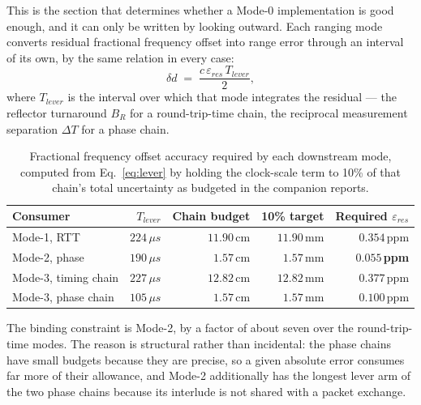 \documentclass[11pt,a4paper]{article}
\newcommand{\us}{\,\ensuremath{\upmu}s}
\providecommand{\upmu}{\mu}
\begin{document}
This is the section that determines whether a Mode-0 implementation is good enough, and it can only
be written by looking outward. Each ranging mode converts residual fractional frequency offset into
range error through an interval of its own, by the same relation in every case:
\begin{equation}
\delta d \;=\; \frac{c\,\varepsilon_{res}\,T_{lever}}{2},
\label{eq:lever}
\end{equation}
where $T_{lever}$ is the interval over which that mode integrates the residual --- the reflector
turnaround $B_R$ for a round-trip-time chain, the reciprocal measurement separation $\Delta T$ for a
phase chain.

\begin{table}[h]
\caption{Fractional frequency offset accuracy required by each downstream mode, computed from
Eq.~\eqref{eq:lever} by holding the clock-scale term to 10\% of that chain's total uncertainty as
budgeted in the companion reports.}
\label{tab:downstream}
\centering\small
\begin{tabular}{@{}L{40mm}rrrr@{}}
\toprule
Consumer & $T_{lever}$ & Chain budget & 10\% target & Required $\varepsilon_{res}$ \\
\midrule
Mode-1, RTT               & $224\us$ & $11.90$\,cm & $11.90$\,mm & $0.354$\,ppm \\
Mode-2, phase             & $190\us$ & $1.57$\,cm  & $1.57$\,mm  & $\mathbf{0.055}$\,\textbf{ppm} \\
Mode-3, timing chain      & $227\us$ & $12.82$\,cm & $12.82$\,mm & $0.377$\,ppm \\
Mode-3, phase chain       & $105\us$ & $1.57$\,cm  & $1.57$\,mm  & $0.100$\,ppm \\
\bottomrule
\end{tabular}
\end{table}

The binding constraint is Mode-2, by a factor of about seven over the round-trip-time modes. The
reason is structural rather than incidental: the phase chains have small budgets because they are
precise, so a given absolute error consumes far more of their allowance, and Mode-2 additionally has
the longest lever arm of the two phase chains because its interlude is not shared with a packet
exchange.
\end{document}
